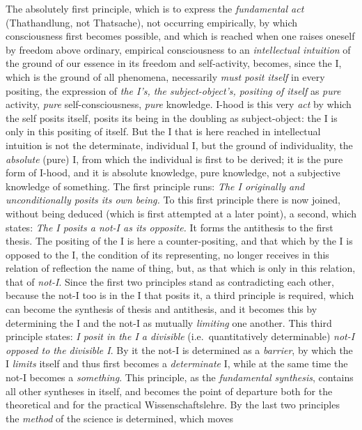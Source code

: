 The absolutely first principle, which is to express the
\emph{fundamental act} (Thathandlung, not Thatsache), not occurring
empirically, by which consciousness first becomes possible, and which is
reached when one raises oneself by freedom above ordinary, empirical
consciousness to an \emph{intellectual intuition} of the ground of our
essence in its freedom and self-activity, becomes, since the I, which is
the ground of all phenomena, necessarily \emph{must posit itself} in
every positing, the expression of \emph{the I's, the subject-object's,
positing of itself} as \emph{pure} activity, \emph{pure}
self-consciousness, \emph{pure} knowledge. I-hood is this very
\emph{act} by which the self posits itself, posits its being in the
doubling as subject-object: the I is only in this positing of itself.
But the I that is here reached in intellectual intuition is not the
determinate, individual I, but the ground of individuality, the
\emph{absolute} (pure) I, from which the individual is first to be
derived; it is the pure form of I-hood, and it is absolute knowledge,
pure knowledge, not a subjective knowledge of something. The first
principle runs: \emph{The I originally and unconditionally posits its
own being.} To this first principle there is now joined, without being
deduced (which is first attempted at a later point), a second, which
states: \emph{The I posits a not-I as its opposite.} It forms the
antithesis to the first thesis. The positing of the I is here a
counter-positing, and that which by the I is opposed to the
I, the condition of its representing, no longer receives in this
relation of reflection the name of thing, but, as that which is only in
this relation, that of \emph{not-I}. Since the first two principles
stand as contradicting each other, because the not-I too is in the I
that posits it, a third principle is required, which can become the
synthesis of thesis and antithesis, and it becomes this by determining
the I and the not-I as mutually \emph{limiting} one another. This third
principle states: \emph{I posit in the I a divisible} (i.e.\
quantitatively determinable) \emph{not-I opposed to the divisible I}.
By it the not-I is determined as a \emph{barrier}, by which the I
\emph{limits} itself and thus first becomes a \emph{determinate} I,
while at the same time the not-I becomes a \emph{something}. This
principle, as the \emph{fundamental synthesis}, contains all other
syntheses in itself, and becomes the point of departure both for the
theoretical and for the practical Wissenschaftslehre. By the last two
principles the \emph{method} of the science is determined, which moves
